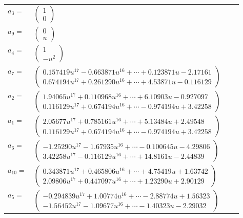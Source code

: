 \documentclass[1p]{elsarticle_modified}
\theoremstyle{definition}
\begin{document}
\begin{tabular}{m{7pt} m{180pt} m{7pt} m{180pt} }
\flushright $a_{3}=$&$\begin{pmatrix}1\\0\end{pmatrix}$ \\
\flushright $a_{9}=$&$\begin{pmatrix}0\\u\end{pmatrix}$ \\
\flushright $a_{4}=$&$\begin{pmatrix}1\\- u^2\end{pmatrix}$ \\
\flushright $a_{7}=$&$\begin{pmatrix}0.157419 u^{17}-0.663871 u^{16}+\cdots+0.123871 u-2.17161\\0.674194 u^{17}+0.261290 u^{16}+\cdots+4.53871 u-0.116129\end{pmatrix}$ \\
\flushright $a_{2}=$&$\begin{pmatrix}1.94065 u^{17}+0.110968 u^{16}+\cdots+6.10903 u-0.927097\\0.116129 u^{17}+0.674194 u^{16}+\cdots-0.974194 u+3.42258\end{pmatrix}$ \\
\flushright $a_{1}=$&$\begin{pmatrix}2.05677 u^{17}+0.785161 u^{16}+\cdots+5.13484 u+2.49548\\0.116129 u^{17}+0.674194 u^{16}+\cdots-0.974194 u+3.42258\end{pmatrix}$ \\
\flushright $a_{6}=$&$\begin{pmatrix}-1.25290 u^{17}-1.67935 u^{16}+\cdots-0.100645 u-4.29806\\3.42258 u^{17}-0.116129 u^{16}+\cdots+14.8161 u-2.44839\end{pmatrix}$ \\
\flushright $a_{10}=$&$\begin{pmatrix}0.343871 u^{17}+0.465806 u^{16}+\cdots+4.75419 u+1.63742\\2.09806 u^{17}+0.447097 u^{16}+\cdots+1.23290 u+2.90129\end{pmatrix}$ \\
\flushright $a_{5}=$&$\begin{pmatrix}-0.294839 u^{17}+1.00774 u^{16}+\cdots-2.88774 u+1.56323\\-1.56452 u^{17}-1.09677 u^{16}+\cdots-1.40323 u-2.29032\end{pmatrix}$ \\

\end{tabular}
\end{document}

